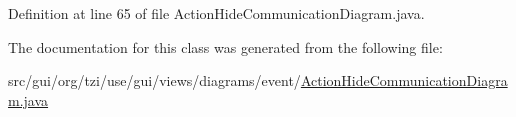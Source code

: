Definition at line 65 of file Action\-Hide\-Communication\-Diagram.\-java.



The documentation for this class was generated from the following file\-:\begin{DoxyCompactItemize}
\item 
src/gui/org/tzi/use/gui/views/diagrams/event/\hyperlink{_action_hide_communication_diagram_8java}{Action\-Hide\-Communication\-Diagram.\-java}\end{DoxyCompactItemize}
